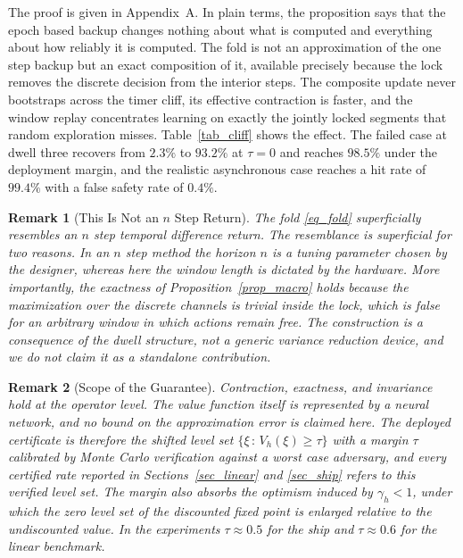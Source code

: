 \documentclass[journal]{IEEEtran}
\newtheorem{remark}{Remark}
\begin{document}
The proof is given in Appendix~A. In plain terms, the proposition says that the epoch based backup changes nothing about what is computed and everything about how reliably it is computed. The fold is not an approximation of the one step backup but an exact composition of it, available precisely because the lock removes the discrete decision from the interior steps. The composite update never bootstraps across the timer cliff, its effective contraction is faster, and the window replay concentrates learning on exactly the jointly locked segments that random exploration misses. Table~\ref{tab_cliff} shows the effect. The failed case at dwell three recovers from $2.3\%$ to $93.2\%$ at $\tau = 0$ and reaches $98.5\%$ under the deployment margin, and the realistic asynchronous case reaches a hit rate of $99.4\%$ with a false safety rate of $0.4\%$.

\begin{remark}[This Is Not an $n$ Step Return]\label{rem_nstep}
The fold \eqref{eq_fold} superficially resembles an $n$ step temporal difference return. The resemblance is superficial for two reasons. In an $n$ step method the horizon $n$ is a tuning parameter chosen by the designer, whereas here the window length is dictated by the hardware. More importantly, the exactness of Proposition~\ref{prop_macro} holds because the maximization over the discrete channels is trivial inside the lock, which is false for an arbitrary window in which actions remain free. The construction is a consequence of the dwell structure, not a generic variance reduction device, and we do not claim it as a standalone contribution.
\end{remark}

\begin{remark}[Scope of the Guarantee]\label{rem_honest}
Contraction, exactness, and invariance hold at the operator level. The value function itself is represented by a neural network, and no bound on the approximation error is claimed here. The deployed certificate is therefore the shifted level set $\{\xi \,:\, V_h(\xi) \ge \tau\}$ with a margin $\tau$ calibrated by Monte Carlo verification against a worst case adversary, and every certified rate reported in Sections~\ref{sec_linear} and \ref{sec_ship} refers to this verified level set. The margin also absorbs the optimism induced by $\gamma_h < 1$, under which the zero level set of the discounted fixed point is enlarged relative to the undiscounted value. In the experiments $\tau \approx 0.5$ for the ship and $\tau \approx 0.6$ for the linear benchmark.
\end{remark}
\end{document}
